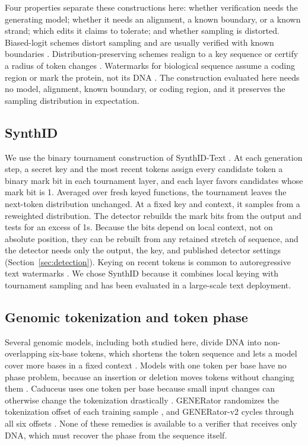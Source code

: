 \documentclass[10pt,twocolumn]{article}
\begin{document}
Four properties separate these constructions here: whether verification needs the generating
model; whether it needs an alignment, a known boundary, or a known strand; which edits it claims to
tolerate; and whether sampling is distorted. Biased-logit schemes distort sampling and are usually
verified with known boundaries \cite{kirchenbauer2023watermark}. Distribution-preserving schemes
realign to a key sequence \cite{kuditipudi2024robust} or certify a radius of token changes
\cite{wu2024dipmark}. Watermarks for biological sequence assume a coding region
\cite{zhang2025securing} or mark the protein, not its DNA \cite{chen2025protein}. The construction evaluated here needs no model, alignment, known boundary, or coding region, and it
preserves the sampling distribution in expectation.

\subsection{SynthID}

We use the binary tournament construction of SynthID-Text \cite{dathathri2024scalable}. At each
generation step, a secret key and the most recent tokens assign every candidate token a binary
mark bit in each tournament layer, and each layer favors candidates whose mark bit is 1. Averaged
over fresh keyed functions, the tournament leaves the next-token distribution unchanged. At a
fixed key and context, it samples from a reweighted distribution. The detector rebuilds the mark
bits from the output and tests for an excess of 1s. Because the bits depend on local context, not
on absolute position, they can be rebuilt from any retained stretch of sequence, and the detector
needs only the output, the key, and published detector settings
(Section~\ref{sec:detection}). Keying on recent tokens is common to
autoregressive text watermarks \cite{kirchenbauer2023watermark}. We chose SynthID because it
combines local keying with tournament sampling and has been evaluated in a large-scale text
deployment.

\subsection{Genomic tokenization and token phase}

Several genomic models, including both studied here, divide DNA into non-overlapping six-base
tokens, which shortens the token sequence and lets a model cover more bases in a fixed context
\cite{dallatorre2025nucleotide,wu2025generator,carbon2026,generatorv22026}. Models with one token
per base have no phase problem, because an insertion or deletion moves tokens without changing them
\cite{nguyen2024evo,nguyen2023hyenadna}. Caduceus uses one token per base because small input
changes can otherwise change the tokenization drastically \cite{schiff2024caduceus}. GENERator
randomizes the tokenization offset of each training sample \cite{wu2025generator}, and
GENERator-v2 cycles through all six offsets \cite{generatorv22026}. None of these remedies is
available to a verifier that receives only DNA, which must recover the phase from the sequence
itself.
\end{document}
